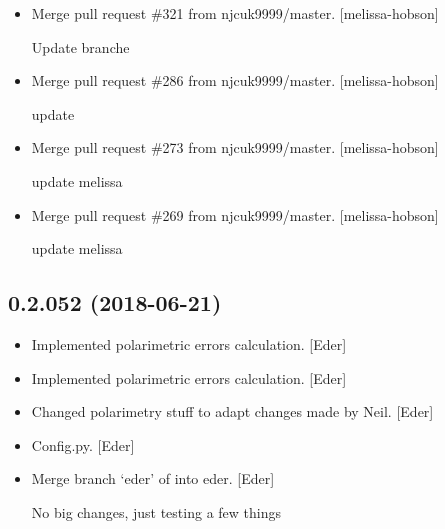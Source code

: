 \documentclass[a4paper,10pt,english]{report}
\begin{document}
\begin{itemize}
\item {} 
Merge pull request \#321 from njcuk9999/master. {[}melissa-hobson{]}

Update branche

\item {} 
Merge pull request \#286 from njcuk9999/master. {[}melissa-hobson{]}

update

\item {} 
Merge pull request \#273 from njcuk9999/master. {[}melissa-hobson{]}

update melissa

\item {} 
Merge pull request \#269 from njcuk9999/master. {[}melissa-hobson{]}

update melissa

\end{itemize}


\subsection{0.2.052 (2018-06-21)}
\label{\detokenize{misc/changelog:id413}}\begin{itemize}
\item {} 
Implemented polarimetric errors calculation. {[}Eder{]}

\item {} 
Implemented polarimetric errors calculation. {[}Eder{]}

\item {} 
Changed polarimetry stuff to adapt changes made by Neil. {[}Eder{]}

\item {} 
Config.py. {[}Eder{]}

\item {} 
Merge branch ‘eder’ of  into
eder. {[}Eder{]}

No big changes, just testing a few things

\end{itemize}
\end{document}
